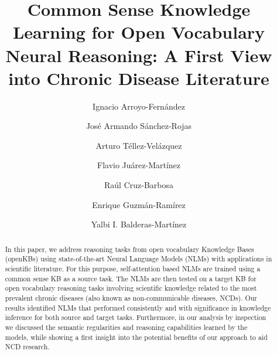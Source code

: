\documentclass[preprint]{elsarticle}
\begin{document}
\begin{frontmatter}

\title{Common Sense Knowledge Learning for Open Vocabulary Neural Reasoning: A First View into Chronic Disease Literature
}

\author{Ignacio Arroyo-Fernández}

\author{José Armando Sánchez-Rojas}


\author{Arturo Téllez-Velázquez}
\author{Flavio Juárez-Martínez}

\author{Raúl Cruz-Barbosa}

\author{Enrique Guzmán-Ramírez}
\author{Yalbi I. Balderas-Martínez}





\begin{abstract}
In this paper, we address reasoning tasks from open vocabulary Knowledge Bases (openKBs) using state-of-the-art Neural Language Models (NLMs) with applications in scientific literature. 
For this purpose, self-attention based NLMs are trained using a common sense KB as a source task. The NLMs are then tested on a target KB for open vocabulary reasoning tasks involving scientific knowledge related to the most prevalent chronic diseases (also known as non-communicable diseases, NCDs). Our results identified NLMs that performed consistently and with significance in knowledge inference for both source and target tasks. Furthermore, in our analysis by inspection we discussed the semantic regularities and reasoning capabilities learned by the models, while showing a first insight into the potential benefits of our approach to aid NCD research.
\end{abstract}


\end{frontmatter}
\end{document}
